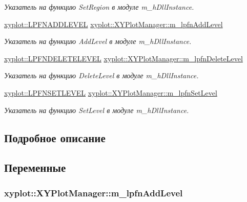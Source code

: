 \begin{DoxyCompactItemize}
\begin{DoxyCompactList}\small\item\em Указатель на функцию Set\-Region в модуле m\-\_\-h\-Dll\-Instance. \end{DoxyCompactList}\item 
\hyperlink{namespacexyplot_acfe1c4a6bf88e4c101cae03f31602993}{xyplot\-::\-L\-P\-F\-N\-A\-D\-D\-L\-E\-V\-E\-L} \hyperlink{group__gr_func_pointers_ga62b0b0bd4d99cf0d395c6ebe713fadfa}{xyplot\-::\-X\-Y\-Plot\-Manager\-::m\-\_\-lpfn\-Add\-Level}
\begin{DoxyCompactList}\small\item\em Указатель на функцию Add\-Level в модуле m\-\_\-h\-Dll\-Instance. \end{DoxyCompactList}\item 
\hyperlink{namespacexyplot_a96f2d0955d7feb162b2730e65398ed64}{xyplot\-::\-L\-P\-F\-N\-D\-E\-L\-E\-T\-E\-L\-E\-V\-E\-L} \hyperlink{group__gr_func_pointers_gadeccbf45813bb1f7ffcb85fb1679b371}{xyplot\-::\-X\-Y\-Plot\-Manager\-::m\-\_\-lpfn\-Delete\-Level}
\begin{DoxyCompactList}\small\item\em Указатель на функцию Delete\-Level в модуле m\-\_\-h\-Dll\-Instance. \end{DoxyCompactList}\item 
\hyperlink{namespacexyplot_ae4a8b61fef16cdd55e9491d30f602509}{xyplot\-::\-L\-P\-F\-N\-S\-E\-T\-L\-E\-V\-E\-L} \hyperlink{group__gr_func_pointers_ga87f88da036cf4c05533e8f913d608ff7}{xyplot\-::\-X\-Y\-Plot\-Manager\-::m\-\_\-lpfn\-Set\-Level}
\begin{DoxyCompactList}\small\item\em Указатель на функцию Set\-Level в модуле m\-\_\-h\-Dll\-Instance. \end{DoxyCompactList}\end{DoxyCompactItemize}


\subsection{Подробное описание}


\subsection{Переменные}
\hypertarget{group__gr_func_pointers_ga62b0b0bd4d99cf0d395c6ebe713fadfa}{
\subsubsection[{m\-\_\-lpfn\-Add\-Level}]{ xyplot\-::\-X\-Y\-Plot\-Manager\-::m\-\_\-lpfn\-Add\-Level\hspace{0.3cm}{\ttfamily [protected]}}}\label{group__gr_func_pointers_ga62b0b0bd4d99cf0d395c6ebe713fadfa}


